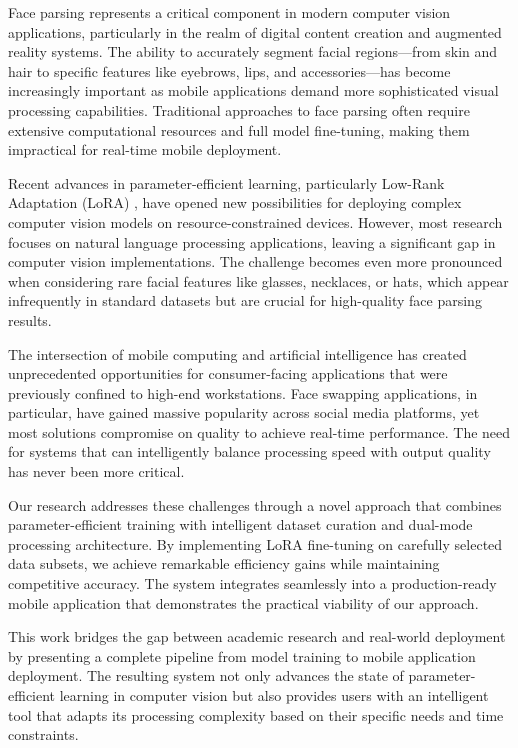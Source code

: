 \documentclass[12pt,a4paper]{report}
\begin{document}
Face parsing represents a critical component in modern computer vision applications, particularly in the realm of digital content creation and augmented reality systems. The ability to accurately segment facial regions—from skin and hair to specific features like eyebrows, lips, and accessories—has become increasingly important as mobile applications demand more sophisticated visual processing capabilities. Traditional approaches to face parsing often require extensive computational resources and full model fine-tuning, making them impractical for real-time mobile deployment.

Recent advances in parameter-efficient learning, particularly Low-Rank Adaptation (LoRA) \cite{hu2021lora}, have opened new possibilities for deploying complex computer vision models on resource-constrained devices. However, most research focuses on natural language processing applications, leaving a significant gap in computer vision implementations. The challenge becomes even more pronounced when considering rare facial features like glasses, necklaces, or hats, which appear infrequently in standard datasets but are crucial for high-quality face parsing results.

The intersection of mobile computing and artificial intelligence has created unprecedented opportunities for consumer-facing applications that were previously confined to high-end workstations. Face swapping applications, in particular, have gained massive popularity across social media platforms, yet most solutions compromise on quality to achieve real-time performance. The need for systems that can intelligently balance processing speed with output quality has never been more critical.

Our research addresses these challenges through a novel approach that combines parameter-efficient training with intelligent dataset curation and dual-mode processing architecture. By implementing LoRA fine-tuning on carefully selected data subsets, we achieve remarkable efficiency gains while maintaining competitive accuracy. The system integrates seamlessly into a production-ready mobile application that demonstrates the practical viability of our approach.

This work bridges the gap between academic research and real-world deployment by presenting a complete pipeline from model training to mobile application deployment. The resulting system not only advances the state of parameter-efficient learning in computer vision but also provides users with an intelligent tool that adapts its processing complexity based on their specific needs and time constraints.
\end{document}
